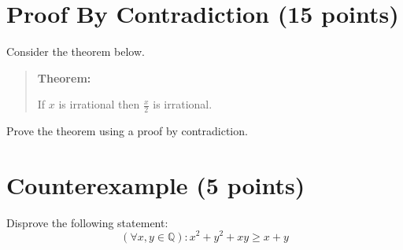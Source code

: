 \documentclass[11pt]{article}
\def\Q{\mathbb{Q}}
\def\sectionOneA#1{}
\def\sectionOneB#1{}
\def\sectionTwoA#1{}
\def\sectionTwoB#1{}
\def\sectionVicsection#1{#1}
\newcounter{pgpts}
\newcounter{cumpts}
\newcommand{\cnewpage}{\addtocounter{cumpts}{\value{pgpts}}\newpage\setcounter{pgpts}{0}}
\begin{document}
\cnewpage

\section{Proof By \sectionOneA{Contrapositive}\sectionOneB{Contrapositive}\sectionTwoA{Contradiction}\sectionTwoB{Contradiction}\sectionVicsection{Contradiction} (15 points)}\addtocounter{pgpts}{15}

Consider the theorem below.
\begin{quote}
  {\bf Theorem:}
  \sectionOneA{If $x^3$ is irrational then $x$ is irrational.}
  \sectionOneB{If $x^4$ is irrational then $x$ is irrational.} %
  \sectionTwoA{If $x^3$ is irrational then $x$ is irrational.}
  \sectionTwoB{If $x^4$ is irrational then $x$ is irrational.} %
  \sectionVicsection{If $x$ is irrational then $\frac{x}{2}$ is irrational.}
  
%
\end{quote}


Prove the theorem using a proof by \sectionOneA{contrapositive}\sectionOneB{contrapositive}\sectionTwoA{contradiction}\sectionTwoB{contradiction}\sectionVicsection{contradiction}.

\vspace*{8cm}


\section{Counterexample (5 points)}\addtocounter{pgpts}{5}
Disprove the following statement:\\
\sectionOneA{$$\forall x,y\in \Q^+: \sqrt{x+y}\not\in\Q^+$$}
\sectionOneB{$$\forall x,y\in \Q^+: \sqrt{x*y}\not\in\Q^+$$} %
\sectionTwoA{$$\forall x,y\in \Q^+: \sqrt{x+y}\not\in\Q^+$$}
\sectionTwoB{$$\forall x,y\in \Q^+: \sqrt{x*y}\not\in\Q^+$$} %
\sectionVicsection{$$ (\forall x,y \in \mathbb{Q}): x^2 + y^2 +xy \geq x+y$$}
\end{document}
